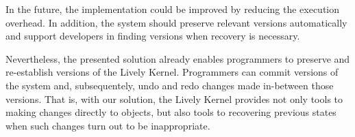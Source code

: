 In the future, the implementation could be improved by reducing the execution overhead.
In addition, the system should preserve relevant versions automatically and support developers in finding versions when recovery is necessary.

Nevertheless, the presented solution already enables programmers to preserve and re-establish versions of the Lively Kernel.
Programmers can commit versions of the system and, subsequentely, undo and redo changes made in-between those versions.
That is, with our solution, the Lively Kernel provides not only tools to making changes directly to objects, but also tools to recovering previous states when such changes turn out to be inappropriate.
